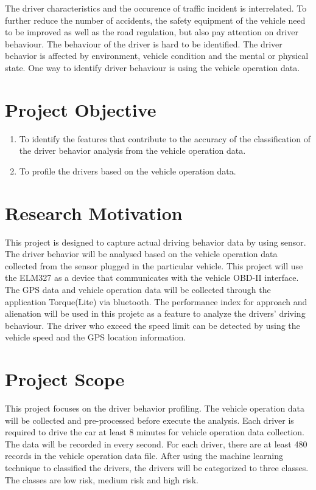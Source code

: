 The driver characteristics and the occurence of traffic incident is interrelated. To further reduce the number of accidents, the safety equipment of the vehicle need to be improved as well as the road regulation, but also pay attention on driver behaviour. The behaviour of the driver is hard to be identified. The driver behavior is affected by environment, vehicle condition and the mental or physical state. One way to identify driver behaviour is using the vehicle operation data.

\section{Project Objective}
\begin{enumerate}
\item To identify the features that contribute to the accuracy of the classification of the driver behavior analysis from the vehicle operation data.
\item To profile the drivers based on the vehicle operation data. 
\end{enumerate}

\section{Research Motivation}
This project is designed to capture actual driving behavior data by using sensor. The driver behavior will be analysed based on the vehicle operation data collected from the sensor plugged in the particular vehicle.  
This project will use the ELM327 as a device that communicates with the vehicle OBD-II interface. The GPS data and vehicle operation data will be collected through the application Torque(Lite) via bluetooth. 
The performance index for approach and alienation will be used in this projetc as a feature to analyze the drivers' driving behaviour. The driver who exceed the speed limit can be detected by using the vehicle speed and the GPS location information.

\section{Project Scope}
This project focuses on the driver behavior profiling. The vehicle operation data will be collected and pre-processed before execute the analysis. Each driver is required to drive the car at least 8 minutes for vehicle operation data collection. The data will be recorded in every second. For each driver, there are at least 480 records in the vehicle operation data file. After using the machine learning technique to classified the drivers, the drivers will be categorized to three classes. The classes are low risk, medium risk and high risk. 
 
